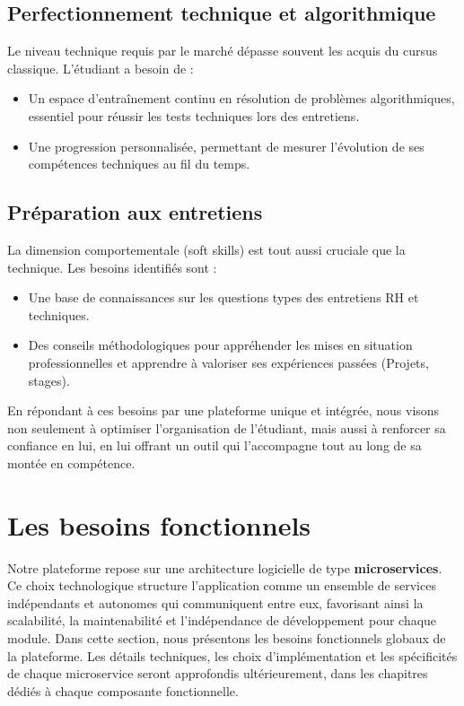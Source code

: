 \documentclass[12pt,a4paper]{report}
\begin{document}
\subsection{Perfectionnement technique et algorithmique}
Le niveau technique requis par le marché dépasse souvent les acquis du cursus classique. L'étudiant a besoin de :
\begin{itemize}
	\item Un espace d'entraînement continu en résolution de problèmes algorithmiques, essentiel pour réussir les tests techniques lors des entretiens.
	\item Une progression personnalisée, permettant de mesurer l'évolution de ses compétences techniques au fil du temps.
\end{itemize}

\subsection{Préparation aux entretiens}
La dimension comportementale (soft skills) est tout aussi cruciale que la technique. Les besoins identifiés sont :
\begin{itemize}
	\item Une base de connaissances sur les questions types des entretiens RH et techniques.
	\item Des conseils méthodologiques pour appréhender les mises en situation professionnelles et apprendre à valoriser ses expériences passées (Projets, stages).
\end{itemize}

\vspace{0.5cm}
En répondant à ces besoins par une plateforme unique et intégrée, nous visons non seulement à optimiser l'organisation de l'étudiant, mais aussi à renforcer sa confiance en lui, en lui offrant un outil qui l'accompagne tout au long de sa montée en compétence.
	
\section{Les besoins fonctionnels}

Notre plateforme repose sur une architecture logicielle de type \textbf{microservices}. Ce choix technologique structure l'application comme un ensemble de services indépendants et autonomes qui communiquent entre eux, favorisant ainsi la scalabilité, la maintenabilité et l'indépendance de développement pour chaque module. Dans cette section, nous présentons les besoins fonctionnels globaux de la plateforme. Les détails techniques, les choix d'implémentation et les spécificités de chaque microservice seront approfondis ultérieurement, dans les chapitres dédiés à chaque composante fonctionnelle.
\end{document}
